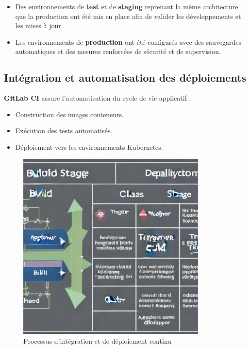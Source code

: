 \begin{itemize}
	\item Des environnements de \textbf{test} et de \textbf{staging} reprenant la même architecture que la production ont été mis en place afin de valider les développements et les mises à jour.
	\item Les environnements de \textbf{production} ont été configurés avec des sauvegardes automatiques et des mesures renforcées de sécurité et de supervision.
\end{itemize}

\subsection{Intégration et automatisation des déploiements}

\textbf{GitLab CI} assure l'automatisation du cycle de vie applicatif :
\begin{itemize}
	\item Construction des images conteneurs.
	\item Exécution des tests automatisés.
	\item Déploiement vers les environnements Kubernetes.
\end{itemize}

\begin{figure}[H]
	\centering
	\includegraphics[width=0.85\textwidth]{figures/gitlab-ci.png}
	\caption{Processus d'intégration et de déploiement continu}
\end{figure}

